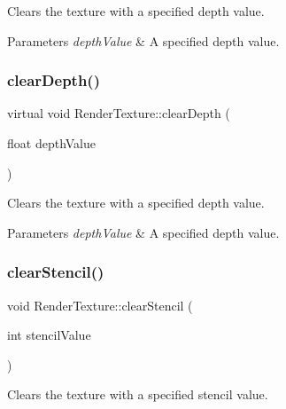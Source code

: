 Clears the texture with a specified depth value.


\begin{DoxyParams}{Parameters}
{\em depth\+Value} & A specified depth value. \\
\hline
\end{DoxyParams}
\mbox{\label{classRenderTexture_a962a6c857ca07ac223bb1ec175633377}} 
\subsubsection{\texorpdfstring{clear\+Depth()}{clearDepth()}\hspace{0.1cm}{\footnotesize\ttfamily [2/2]}}
{\footnotesize\ttfamily virtual void Render\+Texture\+::clear\+Depth (\begin{DoxyParamCaption}\item[{float}]{depth\+Value }\end{DoxyParamCaption})\hspace{0.3cm}{\ttfamily [virtual]}}

Clears the texture with a specified depth value.


\begin{DoxyParams}{Parameters}
{\em depth\+Value} & A specified depth value. \\
\hline
\end{DoxyParams}
\mbox{\label{classRenderTexture_a8c6beead393100c29a32f745f9bafd76}} 
\subsubsection{\texorpdfstring{clear\+Stencil()}{clearStencil()}\hspace{0.1cm}{\footnotesize\ttfamily [1/2]}}
{\footnotesize\ttfamily void Render\+Texture\+::clear\+Stencil (\begin{DoxyParamCaption}\item[{int}]{stencil\+Value }\end{DoxyParamCaption})\hspace{0.3cm}{\ttfamily [virtual]}}

Clears the texture with a specified stencil value.


